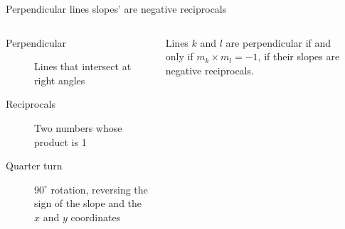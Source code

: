 \begin{frame}{Perpendicular lines slopes' are negative reciprocals}
  \begin{columns}
    \begin{description}
      \item[Perpendicular] Lines that intersect at right angles
      \item[Reciprocals] Two numbers whose product is 1
      \item[Quarter turn] $90^\circ$ rotation, reversing the sign of the slope and the $x$ and $y$ coordinates
    \end{description} \bigskip
    Lines $k$ and $l$ are perpendicular if and only if $m_k \times m_l = -1$, if their slopes are negative reciprocals.
    \begin{flushright}
    \end{flushright}
  \end{columns}
\end{frame}

